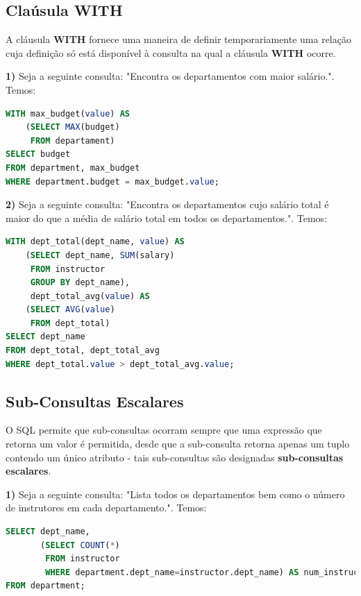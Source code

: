 \documentclass[oneside]{book}
\theoremstyle{definition}
\begin{document}
\subsection{Claúsula WITH}
A cláusula \textbf{WITH} fornece uma maneira de definir temporariamente uma relação cuja definição só está disponível à consulta na qual a cláusula \textbf{WITH} ocorre.

\textbf{1)} Seja a seguinte consulta: "Encontra os departamentos com maior salário.". Temos:
\begin{lstlisting}[language=SQL, morekeywords={REFERENCES, REFRESH, MATERIALIZED, CONCURRENTLY}, framesep=8pt, xleftmargin=40pt, framexleftmargin=40pt, frame=tb, framerule=0pt]
WITH max_budget(value) AS
    (SELECT MAX(budget)
     FROM departament)
SELECT budget
FROM department, max_budget
WHERE department.budget = max_budget.value;
\end{lstlisting}

\textbf{2)} Seja a seguinte consulta: "Encontra os departamentos cujo salário total é maior do que a média de salário total em todos os departamentos.". Temos:
\begin{lstlisting}[language=SQL, morekeywords={REFERENCES, REFRESH, MATERIALIZED, CONCURRENTLY}, framesep=8pt, xleftmargin=40pt, framexleftmargin=40pt, frame=tb, framerule=0pt]
WITH dept_total(dept_name, value) AS
    (SELECT dept_name, SUM(salary)
     FROM instructor
     GROUP BY dept_name),
     dept_total_avg(value) AS 
    (SELECT AVG(value)
     FROM dept_total)
SELECT dept_name
FROM dept_total, dept_total_avg
WHERE dept_total.value > dept_total_avg.value;
\end{lstlisting}

\subsection{Sub-Consultas Escalares}
O SQL permite que sub-consultas ocorram sempre que uma expressão que retorna um valor é permitida, desde que a sub-consulta retorna apenas um tuplo contendo um único atributo - tais sub-consultas são designadas \textbf{sub-consultas escalares}.

\textbf{1)} Seja a seguinte consulta: "Lista todos os departamentos bem como o número de instrutores em cada departamento.". Temos:
\begin{lstlisting}[language=SQL, morekeywords={REFERENCES, REFRESH, MATERIALIZED, CONCURRENTLY}, framesep=8pt, xleftmargin=40pt, framexleftmargin=40pt, frame=tb, framerule=0pt]
SELECT dept_name, 
       (SELECT COUNT(*)
        FROM instructor
        WHERE department.dept_name=instructor.dept_name) AS num_instructors
FROM department;
\end{lstlisting}
\end{document}
